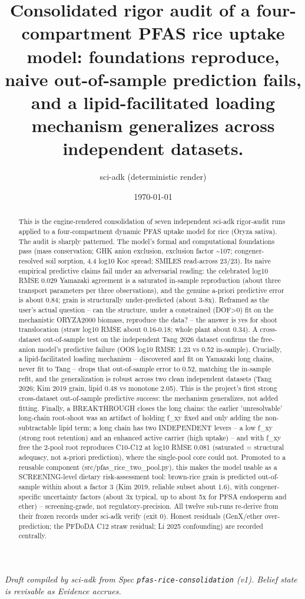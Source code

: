 \documentclass{article}
\title{Consolidated rigor audit of a four-compartment PFAS rice uptake model: foundations reproduce, naive out-of-sample prediction fails, and a lipid-facilitated loading mechanism generalizes across independent datasets.}
\author{sci-adk (deterministic render)}
\date{\today}
\begin{document}
\maketitle

\noindent\textit{Draft compiled by sci-adk from Spec \texttt{pfas-rice-consolidation} (v1). Belief state is revisable as Evidence accrues.}

\begin{abstract}
This is the engine-rendered consolidation of seven independent sci-adk rigor-audit runs applied to a four-compartment dynamic PFAS uptake model for rice (Oryza sativa). The audit is sharply patterned. The model's formal and computational foundations pass (mass conservation; GHK anion exclusion, exclusion factor \textasciitilde{}107; congener-resolved soil sorption, 4.4 log10 Koc spread; SMILES read-across 23/23). Its naive empirical predictive claims fail under an adversarial reading: the celebrated log10 RMSE 0.029 Yamazaki agreement is a saturated in-sample reproduction (about three transport parameters per three observations), and the genuine a-priori predictive error is about 0.84; grain is structurally under-predicted (about 3-8x). Reframed as the user's actual question -- can the structure, under a constrained (DOF>0) fit on the mechanistic ORYZA2000 biomass, reproduce the data? -- the answer is yes for shoot translocation (straw log10 RMSE about 0.16-0.18; whole plant about 0.34). A cross-dataset out-of-sample test on the independent Tang 2026 dataset confirms the free-anion model's predictive failure (OOS log10 RMSE 1.23 vs 0.52 in-sample). Crucially, a lipid-facilitated loading mechanism -- discovered and fit on Yamazaki long chains, never fit to Tang -- drops that out-of-sample error to 0.52, matching the in-sample refit, and the generalization is robust across two clean independent datasets (Tang 2026; Kim 2019 grain, lipid 0.48 vs monotone 2.05). This is the project's first strong cross-dataset out-of-sample predictive success: the mechanism generalizes, not added fitting. Finally, a BREAKTHROUGH closes the long chains: the earlier 'unresolvable' long-chain root-shoot was an artifact of holding f\_xy fixed and only adding the non-subtractable lipid term; a long chain has two INDEPENDENT levers -- a low f\_xy (strong root retention) and an enhanced active carrier (high uptake) -- and with f\_xy free the 2-pool root reproduces C10-C12 at log10 RMSE 0.081 (saturated = structural adequacy, not a-priori prediction), where the single-pool core could not. Promoted to a reusable component (src/pfas\_rice\_two\_pool.py), this makes the model usable as a SCREENING-level dietary risk-assessment tool: brown-rice grain is predicted out-of-sample within about a factor 3 (Kim 2019, reliable subset about 1.6), with congener-specific uncertainty factors (about 3x typical, up to about 5x for PFSA endosperm and ether) -- screening-grade, not regulatory-precision. All twelve sub-runs re-derive from their frozen records under sci-adk verify (exit 0). Honest residuals (GenX/ether over-prediction; the PFDoDA C12 straw residual; Li 2025 confounding) are recorded centrally.
\end{abstract}
\end{document}
